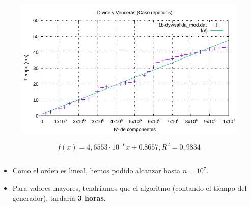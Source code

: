 \documentclass[13pt]{beamer}
\begin{document}
\begin{frame}
\begin{columns}
            \begin{column}{0.6\textwidth}
                \begin{figure}
                    \centering
                    \includegraphics[scale=0.5]{img/e1b-dyv}
                \end{figure}

                \footnotesize

                \begin{equation*}
                    \boxed{f(x) = 4,6553 \cdot 10^{-6} x + 0.8657, R^2 = 0,9834}
                    \label{eq:1b-dyv-eficiencia}
                \end{equation*}
            \end{column}
        \end{columns}

        \begin{itemize}
            \item Como el orden es lineal, hemos podido alcanzar hasta $n = 10^7$. 
            \item Para valores mayores, tendríamos que el algoritmo (contando el tiempo del generador), 
            tardaría \textbf{3 horas}. 
        \end{itemize}
    \end{frame}
\end{document}
